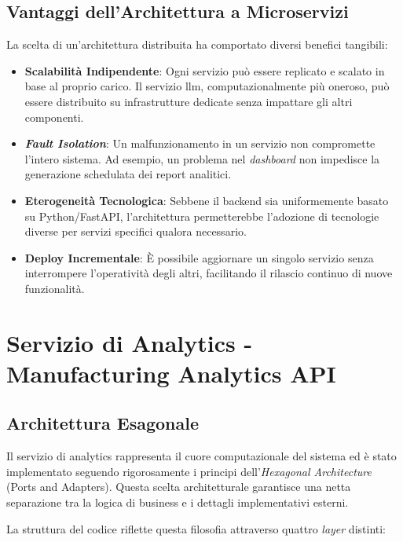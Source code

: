 \subsection{Vantaggi dell'Architettura a Microservizi}
La scelta di un'architettura distribuita ha comportato diversi benefici tangibili:

\begin{itemize}
    \item \textbf{Scalabilità Indipendente}: Ogni servizio può essere replicato e scalato in base al proprio carico. Il servizio \gls{llm}, computazionalmente più oneroso, può essere distribuito su infrastrutture dedicate senza impattare gli altri componenti.
    
    \item \textbf{\textit{Fault Isolation}}: Un malfunzionamento in un servizio non compromette l'intero sistema. Ad esempio, un problema nel \textit{dashboard} non impedisce la generazione schedulata dei report analitici.
    
    \item \textbf{Eterogeneità Tecnologica}: Sebbene il \gls{backend} sia uniformemente basato su Python/FastAPI, l'architettura permetterebbe l'adozione di tecnologie diverse per servizi specifici qualora necessario.
    
    \item \textbf{Deploy Incrementale}: È possibile aggiornare un singolo servizio senza interrompere l'operatività degli altri, facilitando il rilascio continuo di nuove funzionalità.
\end{itemize}

\section{Servizio di Analytics - Manufacturing Analytics API}
\label{sec:analytics_service}

\subsection{Architettura Esagonale}
Il servizio di analytics rappresenta il cuore computazionale del sistema ed è stato implementato seguendo rigorosamente i principi dell'\textit{Hexagonal Architecture} (Ports and Adapters). Questa scelta architetturale garantisce una netta separazione tra la logica di business e i dettagli implementativi esterni.

La struttura del codice riflette questa filosofia attraverso quattro \textit{layer} distinti:

